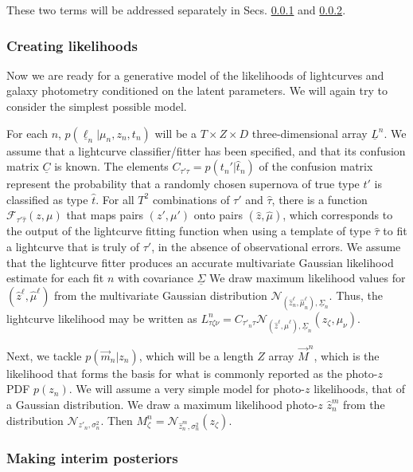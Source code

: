 \documentclass[12pt, onecolumn]{emulateapj}
\newcommand{\textul}{\underline}
\begin{document}
These two terms will be addressed separately in Secs. \ref{sec:likelihoods} and \ref{sec:posteriors}.

\subsubsection{Creating likelihoods}
\label{sec:likelihoods}

Now we are ready for a generative model of the likelihoods of lightcurves and galaxy photometry conditioned on the latent parameters.  We will again try to consider the simplest possible model.  

For each $n$, $p(\textul{\ell}_{n} | \mu_{n}, z_{n}, t_{n})$ will be a $T\times Z\times D$ three-dimensional array $\textul{L}^{n}$.  We assume that a lightcurve classifier/fitter has been specified, and that its confusion matrix $\textul{C}$ is known.  The elements $C_{\tau'\hat{\tau}} = p(t_{n}' | \hat{t}_{n})$ of the confusion matrix represent the probability that a randomly chosen supernova of true type $t'$ is classified as type $\hat{t}$.  For all $T^{2}$ combinations of $\tau'$ and $\hat{\tau}$, there is a function $\mathcal{F}_{\tau'\hat{\tau}}(z, \mu)$ that maps pairs $(z', \mu')$ onto pairs $(\hat{z}, \hat{\mu})$, which corresponds to the output of the lightcurve fitting function when using a template of type $\hat{\tau}$ to fit a lightcurve that is truly of $\tau'$, in the absence of observational errors.  We assume that the lightcurve fitter produces an accurate multivariate Gaussian likelihood estimate for each fit $n$ with covariance $\textul{\Sigma}$  We draw maximum likelihood values for $(\hat{z}^{\ell}, \hat{\mu}^{\ell})$ from the multivariate Gaussian distribution $\mathcal{N}_{(\hat{z}^{\ell}_{n}, \hat{\mu}^{\ell}_{n}), \textul{\Sigma}_{n}}$.  Thus, the lightcurve likelihood may be written as $L^{n}_{\tau\zeta\nu} = C_{\tau'_{n}\tau}\mathcal{N}_{(\hat{z}^{\ell}, \hat{\mu}^{\ell}), \textul{\Sigma}_{n}}(z_{\zeta}, \mu_{\nu})$.

Next, we tackle $p(\vec{m}_{n} | z_{n})$, which will be a length $Z$ array $\vec{M}^{n}$, which is the likelihood that forms the basis for what is commonly reported as the photo-$z$ PDF $p(z_{n})$.   We will assume a very simple model for photo-$z$ likelihoods, that of a Gaussian distribution.  We draw a maximum likelihood photo-$z$ $\hat{z}_{n}^{m}$ from the distribution $\mathcal{N}_{z'_{n}, \sigma_{n}^{2}}$.  Then $M^{n}_{\zeta}=\mathcal{N}_{\hat{z}_{n}^{m}, \sigma_{n}^{2}}(z_{\zeta})$.

\subsubsection{Making interim posteriors}
\label{sec:posteriors}
\end{document}

